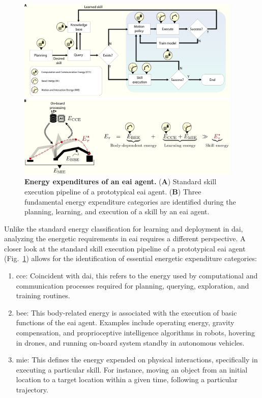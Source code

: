 \documentclass[12pt]{article}
\begin{document}
\begin{figure}[t!]
	\centering
	\hspace*{\fill}
	\includegraphics[width=0.95\textwidth]{eai_energy_categories.png}
	\hspace*{\fill}
	\caption[] {\label{fig:embodied_ai_pipeline} \textbf{Energy expenditures of an \ac{eai} agent.} {(\textbf{A}) Standard skill execution pipeline of a prototypical \ac{eai} agent. (\textbf{B}) Three fundamental energy expenditure categories are identified during the planning, learning, and execution of a skill by an \ac{eai} agent.}}
\end{figure}

Unlike the standard energy classification for learning and deployment in \ac{dai}, analyzing the energetic requirements in \ac{eai} requires a different perspective. A closer look at the standard skill execution pipeline of a prototypical \ac{eai} agent (Fig.~\ref{fig:embodied_ai_pipeline}) allows for the identification of essential energetic expenditure categories:
\begin{enumerate}
	\item \Ac{cce}: Coincident with \ac{dai}, this refers to the energy used by computational and communication processes required for planning, querying, exploration, and training routines.
	\item \Ac{bee}: This body-related energy is associated with the execution of basic functions of the \ac{eai} agent. Examples include operating energy, gravity compensation, and proprioceptive intelligence algorithms in robots, hovering in drones, and running on-board system standby in autonomous vehicles.
	\item \Ac{mie}: This defines the energy expended on physical interactions, specifically in executing a particular skill. For instance, moving an object from an initial location to a target location within a given time, following a particular trajectory.
\end{enumerate}
\end{document}
